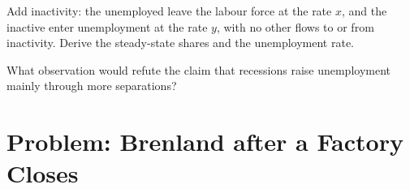 \begin{exercise}[$\star\star\star$]\label{exo:b1:unemployment-flows:three}
Add inactivity: the unemployed leave the labour force at the rate $x$, and
the inactive enter unemployment at the rate $y$, with no other flows to or
from inactivity. Derive the steady-state shares and the unemployment rate.
\end{exercise}

\begin{exercise}[$\star\star\star$]\label{exo:b1:unemployment-flows:refute}
What observation would refute the claim that recessions raise
unemployment mainly through more separations?
\end{exercise}


\section{Problem: Brenland after a Factory Closes}\label{sec:b1:unemployment-flows:problem}


